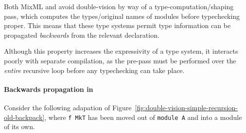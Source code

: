 Both MixML and \OldBackpack{} avoid double-vision by way of a
type-computation/shaping pass, which computes the types/original names
of modules before typechecking proper.  This means that these
type systems permit type information can be propagated \emph{backwards}
from the relevant declaration.

Although this property increases the expressivity of a type
system, it interacts poorly with separate compilation, as the
pre-pass must be performed over the \emph{entire} recursive loop
before any typechecking can take place.

\iffalse%
\paragraph{Backwards propagation in MixML}  Consider the following
example:

\begin{figure}[H]
\begin{tabular}{p{0.40\textwidth} p{0.50\textwidth}}
\begin{lstlisting}[language=ML,escapechar=@]
{ type t,
  val f : t -> t,
  val x = f 2 }
    with
{ type t = int }
\end{lstlisting}
&
\begin{verbatim}
(* mixml 0.2.1 passes with type: *)
it : {f : [int -> int]-,
      t : [= int : #], x : [int]+}
\end{verbatim}
\end{tabular}
\caption{Backwards propagating type information in MixML}
\label{fig:double-vision-backwards-propagating-mixml}
\end{figure}

\noindent
In this example, a module which ordinarily would not typecheck
(there is no reason to believe \verb|t = int|) is mixin linked
with a second module, which introduces the necessary type equality
for \verb|f 2| to typecheck.  We think this is a bit \emph{unusual}.

\Red{But does MixML actually behave this way, or is it an
implementation bug? Point out that the suggested encoding for signature
refinement is not upheld faithfully here.}
\fi
\paragraph{Backwards propagation in \OldBackpack{}}

Consider the following adapation of
Figure~\ref{fig:double-vision-simple-recursion-old-backpack}, where
\verb|f MkT| has been moved out of \verb|module A| and into a module of
its own.

